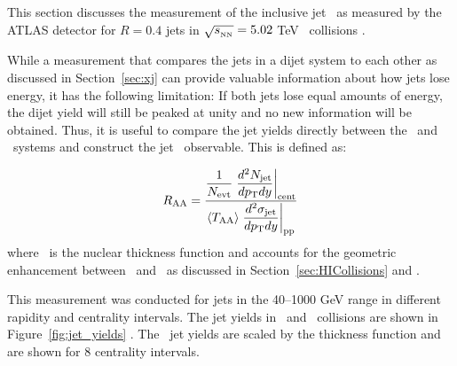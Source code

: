 
This section discusses the measurement of the inclusive jet \RAA\ as measured by the ATLAS detector for $R=0.4$ jets in $\mbox{$\sqrt{s_{_\text{NN}}}$}=5.02$ TeV \pbpb\ collisions \cite{2019108}.

While a measurement that compares the jets in a dijet system to each other as discussed in Section~\ref{sec:xj} can provide valuable information about how jets lose energy, it has the following limitation: If both jets lose equal amounts of energy, the dijet yield will still be peaked at unity and no new information will be obtained.
Thus, it is useful to compare the jet yields directly between the \pp\ and \pbpb\ systems and construct the jet \RAA\ observable.
This is defined as:

\begin{align}
\mbox{$R_{\rm AA}$}  = \dfrac{\dfrac{1}{N_{\rm evt}} \left.
\dfrac{d^2 N_{\rm jet}}{d\mbox{$p_{\mathrm{T}}$} dy} \right|_{\rm cent}}{ \langle T_{\rm AA} \rangle \left.
\dfrac{d^2\sigma_{\rm jet}}{d\mbox{$p_{\mathrm{T}}$} dy} \right|_{\rm pp}}
\end{align}
where \TAA\ is the nuclear thickness function and accounts for the geometric enhancement between \pp\ and \pbpb\ as discussed in Section~\ref{sec:HICollisions} and \cite{doi:10.1146/annurev.nucl.57.090506.123020}.


This measurement was conducted for jets in the 40--1000 GeV range in different rapidity and centrality intervals.
The jet yields in \pp\ and \pbpb\ collisions are shown in Figure~\ref{fig:jet_yields} .
The \pbpb\ jet yields are scaled by the thickness function and are shown for 8 centrality intervals.


